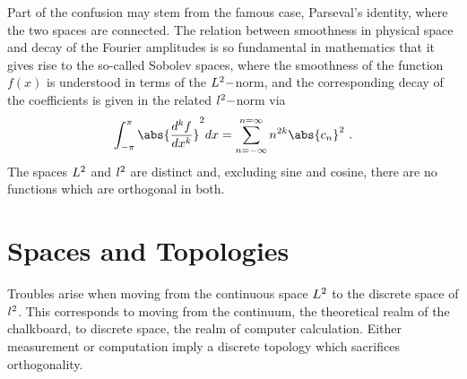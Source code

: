 \documentclass[conference]{worldcomp}
\begin{document}
Part of the confusion may stem from the famous case, Parseval's identity, where the two spaces are connected. 
The relation between smoothness in physical space and decay of the Fourier amplitudes is so fundamental in mathematics that it gives rise to the so-called Sobolev spaces, where the smoothness of the function $f(x)$ is understood in terms of the $L^{2}-$norm, and the corresponding decay of the coefficients is given in the related $l^{2}-$norm via
  \begin{equation}
    \int_{-\pi}^{\pi} \abs{\frac{d^{k}f}{dx^{k}}}^{2} dx = \sum_{n=-\infty}^{n=\infty} n^{2k} \abs{c_{n}}^{2} \ .
  \end{equation}
The spaces $L^{2}$ and $l^{2}$ are distinct and, excluding sine and cosine, there are no functions which are orthogonal in both.

\section{Spaces and Topologies}
Troubles arise when moving from the continuous space $L^{2}$ to the discrete space of $l^{2}$. This corresponds to moving from the continuum, the theoretical realm of the chalkboard, to discrete space, the realm of computer calculation. Either measurement or computation imply a discrete topology which sacrifices orthogonality.
\end{document}
